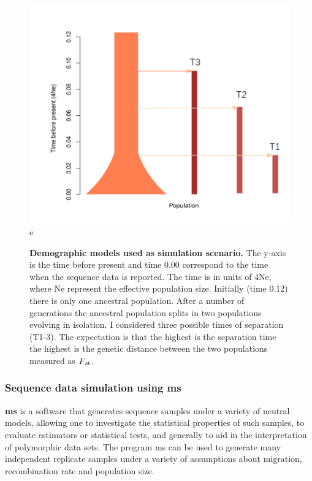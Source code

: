 \begin{figure}[H]
\centering
\includegraphics[width=1.00\textwidth]{fig/populations.png}
\decoRule
e\caption{\textbf{Demographic models used as simulation scenario.} The y-axis is the time before present and time 0.00 correspond to the time when the sequence data is reported. The time is in units of 4Ne, where Ne represent the effective population size. Initially (time 0.12) there is only one ancestral population. After a number of generations the ancestral population splits in two populations evolving in isolation. I considered three possible times of separation (T1-3). The expectation is that the highest is the separation time the highest is the genetic distance between the two populations measured as $F\textsubscript{st}$.} 
\label{fig:population.pdf}
\end{figure}

\subsubsection{Sequence data simulation using \textbf{ms}}
\textbf{ms} \cite{hudson2004ms} is a software that generates sequence samples under a variety of neutral models, allowing one to investigate the statistical properties of such samples, to evaluate estimators or statistical tests, and generally to aid in the interpretation of polymorphic data sets. The program ms can be used to generate many independent replicate samples under a variety of assumptions about migration, recombination rate and population size.\\ 

